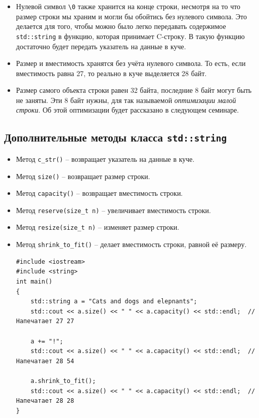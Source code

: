 \documentclass{article}
\begin{document}
\begin{itemize}
\item Нулевой символ \texttt{\textbackslash 0} также хранится на конце строки, несмотря на то что размер строки мы храним и могли бы обойтись без нулевого символа. Это делается для того, чтобы можно было легко передавать содержимое \texttt{std::string} в функцию, которая принимает C-строку. В такую функцию достаточно будет передать указатель на данные в куче.
\item Размер и вместимость хранятся без учёта нулевого символа. То есть, если вместимость равна 27, то реально в куче выделяется 28 байт.
\item Размер самого объекта строки равен 32 байта, последние 8 байт могут быть не заняты. Эти 8 байт нужны, для так называемой \textit{оптимизации малой строки}. Об этой оптимизации будет рассказано в следующем семинаре.
\end{itemize}

\subsection*{Дополнительные методы класса \texttt{std::string}}

\begin{itemize}
\item Метод \texttt{c\_str()} -- возвращает указатель на данные в куче.
\item Метод \texttt{size()} -- возвращает размер строки.
\item Метод \texttt{capacity()} -- возвращает вместимость строки.
\item Метод \texttt{reserve(size\_t n)} -- увеличивает вместимость строки.
\item Метод \texttt{resize(size\_t n)} -- изменяет размер строки.
\item Метод \texttt{shrink\_to\_fit()} -- делает вместимость строки, равной её размеру.
\begin{lstlisting}
#include <iostream>
#include <string>
int main()
{
    std::string a = "Cats and dogs and elepnants";
    std::cout << a.size() << " " << a.capacity() << std::endl;  // Напечатает 27 27
    
    a += "!";
    std::cout << a.size() << " " << a.capacity() << std::endl;  // Напечатает 28 54
    
    a.shrink_to_fit();
    std::cout << a.size() << " " << a.capacity() << std::endl;  // Напечатает 28 28
}
\end{lstlisting}
\end{itemize}
\end{document}
